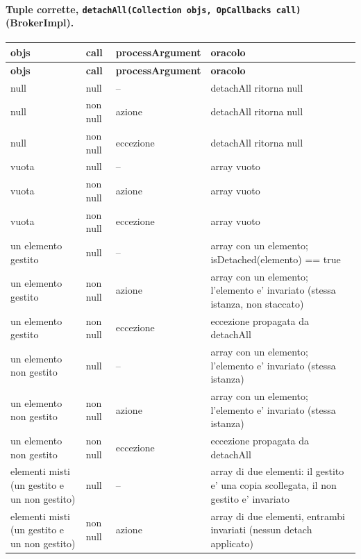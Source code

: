 \paragraph*{Tuple corrette, \texttt{detachAll(Collection objs, OpCallbacks call)} (BrokerImpl).}

{\footnotesize\setlength{\tabcolsep}{3pt}
\begin{longtable}{>{\raggedright\arraybackslash}p{}>{\raggedright\arraybackslash}p{}>{\raggedright\arraybackslash}p{}>{\raggedright\arraybackslash}p{}}
\toprule
\textbf{objs} & \textbf{call} & \textbf{processArgument} & \textbf{oracolo} \\
\midrule
\endfirsthead
\toprule
\textbf{objs} & \textbf{call} & \textbf{processArgument} & \textbf{oracolo} \\
\midrule
\endhead
\bottomrule
\endfoot
null & null & -- & detachAll ritorna null \\
null & non null & azione & detachAll ritorna null \\
null & non null & eccezione & detachAll ritorna null \\
vuota & null & -- & array vuoto \\
vuota & non null & azione & array vuoto \\
vuota & non null & eccezione & array vuoto \\
un elemento gestito & null & -- & array con un elemento; isDetached(elemento) == true \\
un elemento gestito & non null & azione & array con un elemento; l'elemento e' invariato (stessa istanza, non staccato) \\
un elemento gestito & non null & eccezione & eccezione propagata da detachAll \\
un elemento non gestito & null & -- & array con un elemento; l'elemento e' invariato (stessa istanza) \\
un elemento non gestito & non null & azione & array con un elemento; l'elemento e' invariato (stessa istanza) \\
un elemento non gestito & non null & eccezione & eccezione propagata da detachAll \\
elementi misti (un gestito e un non gestito) & null & -- & array di due elementi: il gestito e' una copia scollegata, il non gestito e' invariato \\
elementi misti (un gestito e un non gestito) & non null & azione & array di due elementi, entrambi invariati (nessun detach applicato) \\

\end{longtable}}
